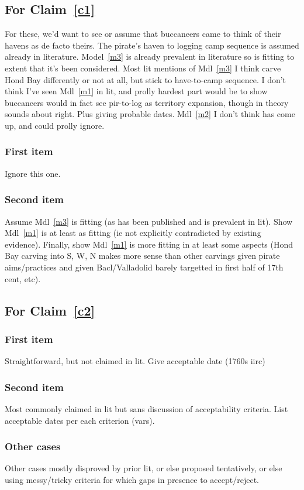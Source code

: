 \documentclass{amsart}
\theoremstyle{definition}%
\theoremstyle{definition}%
\begin{document}
\subsection{For Claim~\ref{c1}}
For these, we'd want to see or assume that buccaneers came to think of their havens as de facto theirs. The pirate's haven to logging camp sequence is assumed already in literature. Model~\ref{m3} is already prevalent in literature so is fitting to extent that it's been considered. Most lit mentions of Mdl~\ref{m3} I think carve Hond Bay differently or not at all, but stick to have-to-camp sequence. I don't think I've seen Mdl~\ref{m1} in lit, and prolly hardest part would be to show buccaneers would in fact see pir-to-log as territory expansion, though in theory sounds about right. Plus giving probable dates. Mdl~\ref{m2} I don't think has come up, and could prolly ignore.
\subsubsection{First item} Ignore this one.
\subsubsection{Second item} Assume Mdl~\ref{m3} is fitting (as has been published and is prevalent in lit). Show Mdl~\ref{m1} is at least as fitting (ie not explicitly contradicted by existing evidence). Finally, show Mdl~\ref{m1} is more fitting in at least some aspects (Hond Bay carving into S, W, N makes more sense than other carvings given pirate aims/practices and given Bacl/Valladolid barely targetted in first half of 17th cent, etc).
%
%
%
%
\subsection{For Claim~\ref{c2}}
\subsubsection{First item} Straightforward, but not claimed in lit. Give acceptable date (1760s iirc)
\subsubsection{Second item} Most commonly claimed in lit but sans discussion of acceptability criteria. List acceptable dates per each criterion (vars).
\subsubsection{Other cases} Other cases mostly disproved by prior lit, or else proposed tentatively, or else using messy/tricky criteria for which gaps in presence to accept/reject.
%
%
%
%
\end{document}
